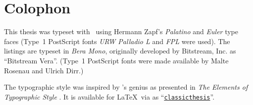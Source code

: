 \pagestyle{empty}

\hfill

\vfill


\section*{Colophon}
This thesis was typeset with \LaTeXe\ using Hermann Zapf's \emph{Palatino} and \emph{Euler} type faces (Type~1 PostScript fonts \emph{URW Palladio L} and \emph{FPL} were used). The listings are typeset in \emph{Bera Mono}, originally developed by Bitstream, Inc. as ``Bitstream Vera''. (Type~1 PostScript fonts were made available by Malte Rosenau and Ulrich Dirr.)

The typographic style was inspired by 's genius as presented in \emph{The Elements of Typographic Style} \citep{bringhurst:2002}. It is available for \LaTeX\ via  as ``\href{http://www.ctan.org/tex-archive/macros/latex/contrib/classicthesis/}{\texttt{classicthesis}}''.




\bigskip

\noindent\finalVersionString